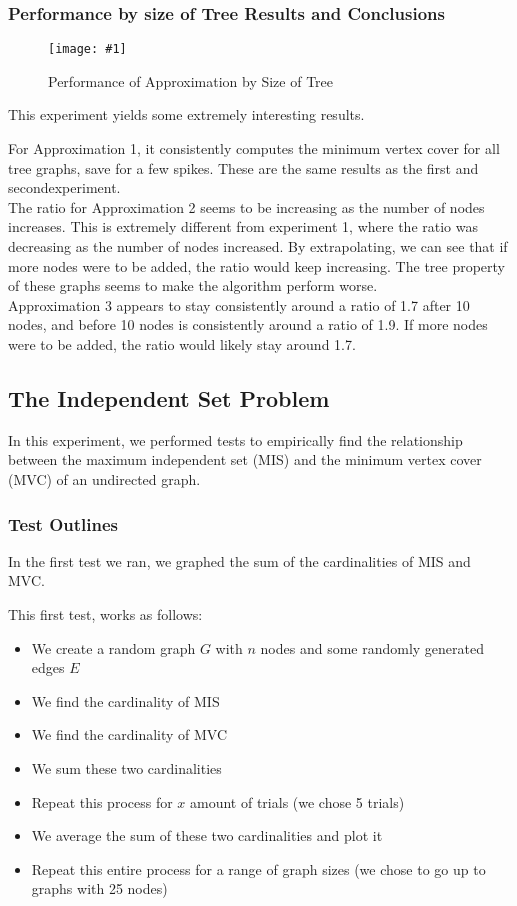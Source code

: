 \documentclass[12pt]{article}
\newcommand{\firgureBuffered}[2]
{
    \begin{figure}[ht!]
        \centering
        \texttt{[image: \#1]}
        \caption{#2}
    \end{figure}
}
\begin{document}
\subsubsection{Performance by size of Tree Results and Conclusions}

\FloatBarrier{}
\firgureBuffered{images/approxexperiments/Tree1.png}{Performance of Approximation by Size of Tree}
\FloatBarrier{}

This experiment yields some extremely interesting results.

For Approximation 1, it consistently computes the minimum vertex cover for all tree graphs, save for a few spikes. These are the same results as the first and secondexperiment. \\

The ratio for Approximation 2 seems to be increasing as the number of nodes increases. This is extremely different from experiment 1, where the ratio was decreasing as the number of nodes increased. By extrapolating, we can see that if more nodes were to be added, the ratio would keep increasing. The tree property of these graphs seems to make the algorithm perform worse.\\

Approximation 3 appears to stay consistently around a ratio of 1.7 after 10 nodes, and before 10 nodes is consistently around a ratio of 1.9. If more nodes were to be added, the ratio would likely stay around 1.7. \\

\subsection{The Independent Set Problem}
In this experiment, we performed tests to empirically find the relationship between the maximum 
independent set (MIS) and the minimum vertex cover (MVC) of an undirected graph.

\subsubsection{Test Outlines}

In the first test we ran, we graphed the sum of the cardinalities of MIS and MVC.

This first test, works as follows:

\begin{itemize}
    \item We create a random graph $G$ with $n$ nodes and some randomly generated edges $E$
    \item We find the cardinality of MIS
    \item We find the cardinality of MVC
    \item We sum these two cardinalities 
    \item Repeat this process for $x$ amount of trials (we chose 5 trials)
    \item We average the sum of these two cardinalities and plot it 
    \item Repeat this entire process for a range of graph sizes (we chose to go up to graphs with 25 nodes)
\end{itemize}
\end{document}
